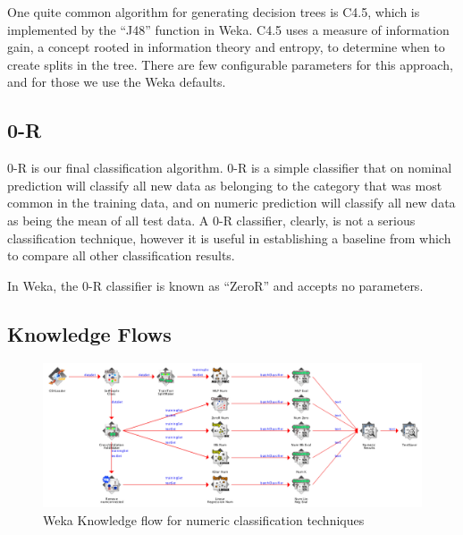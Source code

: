 One quite common algorithm for generating decision trees is C4.5, which is implemented by the ``J48'' function in Weka. C4.5 uses a measure of information gain, a concept rooted in information theory and entropy, to determine when to create splits in the tree. There are few configurable parameters for this approach, and for those we use the Weka defaults.

\section{0-R}
0-R is our final classification algorithm. 0-R is a simple classifier that on nominal prediction will classify all new data as belonging to the category that was most common in the training data, and on numeric prediction will classify all new data as being the mean of all test data. A 0-R classifier, clearly, is not a serious classification technique, however it is useful in establishing a baseline from which to compare all other classification results.

In Weka, the 0-R classifier is known as ``ZeroR'' and accepts no parameters.

\begin{landscape}
\chapter{Knowledge Flows}
\label{chap:knowledgeflows}

\begin{figure}[H]
\centering
\includegraphics[width=\linewidth]{../diagrams/knowledgeflow-numeric.png}
\caption{Weka Knowledge flow for numeric classification techniques}
\end{figure}
\end{landscape}

